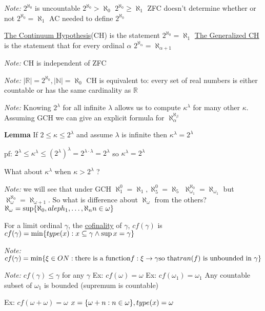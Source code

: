 \emph{Note: } $2^{\aleph_0}$ is uncountable
$2^{\aleph_0} > \aleph_0$
$2^{\aleph_0} \geq \aleph_1$
ZFC doesn't determine whether or not $2^{\aleph_0} = \aleph_1$
AC needed to define $2^{\aleph_0}$

\dfn \underline{The Continuum Hypothesis}(CH) is the statement $2^{\aleph_0} = \aleph_1$
\underline{The Generalized CH} is the statement that for every ordinal $\alpha$ $2^{\aleph_\alpha} = \aleph_{\alpha+1}$

\emph{Note:} CH is independent of ZFC

\newcommand{\NN}{\mathbb N}
\newcommand{\ZZ}{\mathbb Z}
\newcommand{\QQ}{\mathbb Q}
\newcommand{\RR}{\mathbb R}
\emph{Note: } $|\RR| = 2^{\aleph_0}, |\NN| = \aleph_0$
CH is equivalent to: every set of real numbers is either countable or has the same cardinality as $\RR$

\emph{Note: } Knowing $2^\lambda$ for all infinite $\lambda$ allows us to compute $\kappa^\lambda$ for many other $\kappa$.
Assuming GCH we can give an explicit formula for $\aleph_\alpha^{\aleph_\beta}$

\textbf{Lemma} If $2 \leq \kappa \leq 2^\lambda$ and assume $\lambda$ is infinite
then $\kappa^\lambda = 2^\lambda$

pf: $2^\lambda \leq \kappa^\lambda \leq (2^\lambda)^\lambda = 2^{\lambda \cdot \lambda} = 2^\lambda$ so $\kappa^\lambda = 2^\lambda$

What about $\kappa^\lambda$ when $\kappa > 2^\lambda$ ?

\emph{Note: } we will see that under GCH $\aleph_1^0 = \aleph_1, \aleph_5^0 = \aleph_5$
$\aleph_{\omega_1}^{\aleph_0} = \aleph_{\omega_1}$
but $\aleph_\omega^{\aleph_0} = \aleph_{\omega + 1}$.
So what is difference about $\aleph_\omega$ from the others?
$\aleph_\omega = \sup\{\aleph_0, aleph_1, \dots , \aleph_n n \in \omega\}$

\dfn For a limit ordinal $\gamma$, the \underline{cofinality} of $\gamma$, $cf(\gamma)$ is
$cf(\gamma) = \min\{type(x) : x \subseteq \gamma \wedge \sup x = \gamma\}$

\emph{Note: } $cf(\gamma) =\min\{\xi \in ON : \text{there is a function} f : \xi \rightarrow \gamma \text{so that} ran(f) \text{ is unbounded in } \gamma\}$

\emph{Note: } $cf(\gamma) \leq \gamma$ for any $\gamma$
Ex: $cf(\omega) = \omega$
Ex: $cf(\omega_1) = \omega_1$
Any countable subset of $\omega_1$ is bounded (supremum is countable)

Ex: $cf(\omega + \omega) = \omega$
$x = \{\omega + n : n \in \omega\}, type(x) = \omega$

